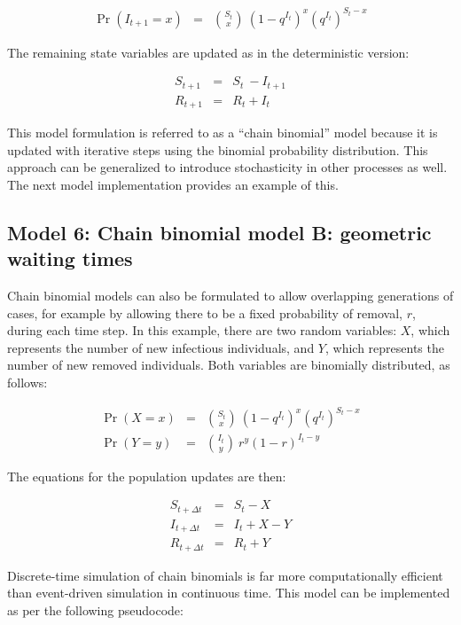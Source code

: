 \documentclass[margin,line,11pt]{article}
\begin{document}
\begin{eqnarray*}
\Pr (I_{t+1}=x) &=& \binom{S_t}{x}\ (1-q^{I_t})^x (q^{I_t})^{S_t-x}
\end{eqnarray*}

\noindent The remaining state variables are updated as in the deterministic version:

\begin{eqnarray*}
S_{t+1} &=& S_t\ - I_{t+1} \\
R_{t+1} &=& R_t + I_t
\end{eqnarray*}

\noindent This model formulation is referred to as a ``chain binomial'' model because it is updated with iterative steps using the binomial probability distribution. This approach can be generalized to introduce stochasticity in other processes as well. The next model implementation provides an example of this.

\subsection{Model 6: Chain binomial model B: geometric waiting times}

Chain binomial models can also be formulated to allow overlapping generations of cases, for example by allowing there to be a fixed probability of removal, $r$, during each time step. In this example, there are two random variables: $X$, which represents the number of new infectious individuals, and $Y$, which represents the number of new removed individuals. Both variables are binomially distributed, as follows:

\begin{eqnarray*}
\Pr (X=x) &=& \binom{S_t}{x}\ (1-q^{I_t})^x (q^{I_t})^{S_t-x}\\
\Pr (Y=y) &=& \binom{I_t}{y}\ r^y (1-r)^{I_t-y}
\end{eqnarray*}


\noindent The equations for the population updates are then:

\begin{eqnarray*}
S_{t+\Delta t} &=& S_t - X \\
I_{t+\Delta t} &=& I_t + X - Y \\
R_{t+\Delta t} &=& R_t + Y
\end{eqnarray*}

\noindent Discrete-time simulation of chain binomials is far more computationally efficient than event-driven simulation in continuous time. This model can be implemented as per the following pseudocode:\\
\end{document}
